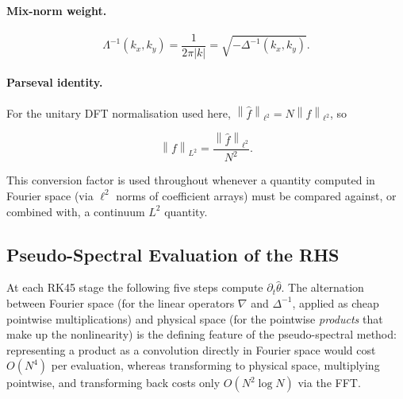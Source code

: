 \documentclass[12pt,a4paper]{article}
\newcommand{\norm}[1]{\left\lVert#1\right\rVert}
\newcommand{\lapinv}{\Delta^{-1}}
\newcommand{\Linv}{\Lambda^{-1}}
\theoremstyle{definition}
\theoremstyle{plain}
\begin{document}
\paragraph{Mix-norm weight.}
\begin{equation}
  \Linv(k_x,k_y)
  = \frac{1}{2\pi|k|}
  = \sqrt{-\lapinv(k_x,k_y)}.
\end{equation}

\paragraph{Parseval identity.}
For the unitary DFT normalisation used here,
$\norm{\hat f}_{\ell^2} = N\norm{f}_{\ell^2}$, so

\begin{equation}
  \norm{f}_{L^2} = \frac{\norm{\hat f}_{\ell^2}}{N^2}.
\end{equation}

This conversion factor is used throughout whenever a quantity computed in
Fourier space (via $\ell^2$ norms of coefficient arrays) must be compared
against, or combined with, a continuum $L^2$ quantity.

\subsection{Pseudo-Spectral Evaluation of the RHS}
\label{sec:rhs}

At each RK45 stage the following five steps compute $\partial_t\hat\theta$.
The alternation between Fourier space (for the linear operators $\nabla$
and $\lapinv$, applied as cheap pointwise multiplications) and physical
space (for the pointwise \emph{products} that make up the nonlinearity)
is the defining feature of the pseudo-spectral method: representing a
product as a convolution directly in Fourier space would cost $O(N^4)$
per evaluation, whereas transforming to physical space, multiplying
pointwise, and transforming back costs only $O(N^2\log N)$ via the FFT.
\end{document}
